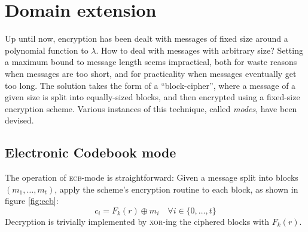 
\section{Domain extension}

Up until now, encryption has been dealt with messages of fixed size around a polynomial function to $\lambda$. How to deal with messages with arbitrary size? Setting a maximum bound to message length seems impractical, both for waste reasons when messages are too short, and for practicality when messages eventually get too long. The solution takes the form of a ``block-cipher'', where a message of a given size is split into equally-sized blocks, and then encrypted using a fixed-size encryption scheme. Various instances of this technique, called \emph{modes}, have been devised.

\subsection{Electronic Codebook mode}

The operation of \textsc{ecb}-mode is straightforward: Given a message split into blocks $(m_1, \dots, m_t)$, apply the scheme's encryption routine to each block, as shown in figure \ref{fig:ecb}:
\[
    c_i = F_k(r) \oplus m_i \quad \forall i \in \{0, \dots, t\}
\]
Decryption is trivially implemented by \textsc{xor}-ing the ciphered blocks with $F_k(r)$.


